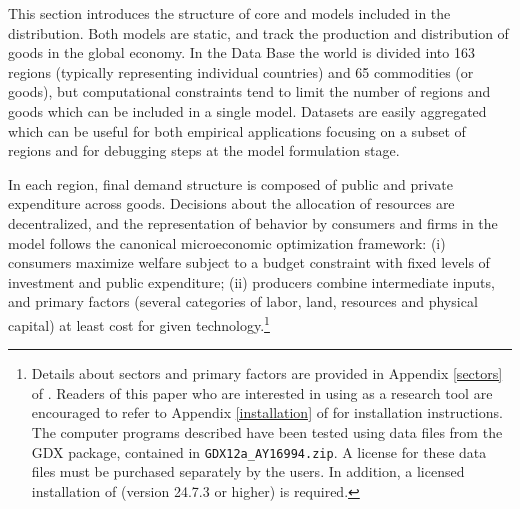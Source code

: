 This section introduces the structure of core \GMR and \SOE models
included in the \GTAPINGAMS distribution. Both models are static, and
track the production and distribution of goods in the global economy.
In the  Data Base the world is divided into 163 regions
(typically representing individual countries) and 65 commodities (or
goods), but computational constraints tend to limit the number of
regions and goods which can be included in a single
model. Datasets are easily aggregated which can be useful for
both empirical applications focusing on a subset of regions and for
debugging steps at the model formulation stage.

In each region, final demand structure is composed of public and
private expenditure across goods. Decisions about the allocation of
resources are decentralized, and the representation of behavior by
consumers and firms in the model follows the canonical microeconomic
optimization framework: (i) consumers maximize welfare subject to a
budget constraint with fixed levels of investment and public
expenditure; (ii) producers combine intermediate inputs, and primary
factors (several categories of labor, land, resources and physical
capital) at least cost for given technology.\footnote{Details about
  \GTAP sectors and primary factors are provided in Appendix
  \ref{sectors} of \DOCU.  Readers of this paper
  who are interested in using \GTAPINGAMS as a research tool are
  encouraged to refer to Appendix \ref{installation} of
  \DOCU for installation instructions. The
  computer programs described have been tested using data files from
  the  GDX package, contained in
  \texttt{GDX12a\_AY16994.zip}. A license for these data files must be
  purchased separately by the users. In addition, a licensed
  installation of \GAMS (version 24.7.3 or higher) is required. }

